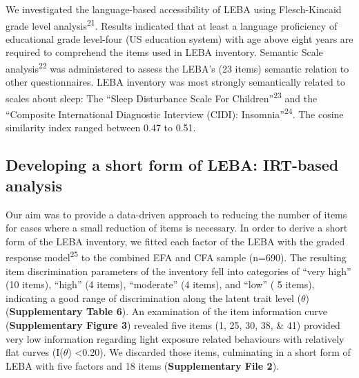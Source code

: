 \documentclass[
  man]{apa6}
\begin{document}
We investigated the language-based accessibility of LEBA using Flesch-Kincaid grade level analysis\textsuperscript{21}. Results indicated that at least a language proficiency of educational grade level-four (US education system) with age above eight years are required to comprehend the items used in LEBA inventory. Semantic Scale analysis\textsuperscript{22} was administered to assess the LEBA's (23 items) semantic relation to other questionnaires. LEBA inventory was most strongly semantically related to scales about sleep: The ``Sleep Disturbance Scale For Children''\textsuperscript{23} and the ``Composite International Diagnostic Interview (CIDI): Insomnia''\textsuperscript{24}. The cosine similarity index ranged between 0.47 to 0.51.

\hypertarget{developing-a-short-form-of-leba-irt-based-analysis}{%
\subsection{Developing a short form of LEBA: IRT-based analysis}\label{developing-a-short-form-of-leba-irt-based-analysis}}

Our aim was to provide a data-driven approach to reducing the number of items for cases where a small reduction of items is necessary. In order to derive a short form of the LEBA inventory, we fitted each factor of the LEBA with the graded response model\textsuperscript{25} to the combined EFA and CFA sample (n=690). The resulting item discrimination parameters of the inventory fell into categories of ``very high'' (10 items), ``high'' (4 items), ``moderate'' (4 items), and ``low'' ( 5 items), indicating a good range of discrimination along the latent trait level (\(\theta\)) (\textbf{Supplementary Table 6}). An examination of the item information curve (\textbf{Supplementary Figure 3}) revealed five items (1, 25, 30, 38, \& 41) provided very low information regarding light exposure related behaviours with relatively flat curves (I(\(\theta\)) \textless0.20). We discarded those items, culminating in a short form of LEBA with five factors and 18 items (\textbf{Supplementary File 2}).
\end{document}

